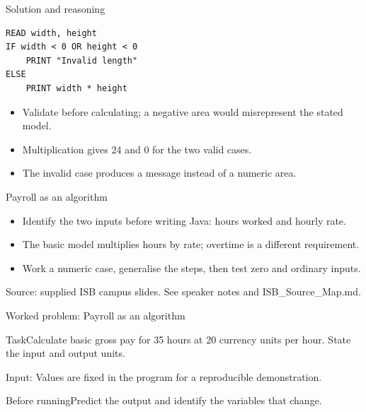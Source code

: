 \documentclass[10pt,aspectratio=169]{beamer}
\begin{document}
\begin{frame}[fragile,t]{Solution and reasoning}
\begin{lstlisting}
READ width, height
IF width < 0 OR height < 0
    PRINT "Invalid length"
ELSE
    PRINT width * height
\end{lstlisting}\vspace{1mm}\small\begin{itemize}
\item Validate before calculating; a negative area would misrepresent the stated model.
\item Multiplication gives 24 and 0 for the two valid cases.
\item The invalid case produces a message instead of a numeric area.
\end{itemize}
\end{frame}

\begin{frame}[fragile,t]{Payroll as an algorithm}
\begin{itemize}
\item Identify the two inputs before writing Java: hours worked and hourly rate.
\item The basic model multiplies hours by rate; overtime is a different requirement.
\item Work a numeric case, generalise the steps, then test zero and ordinary inputs.
\end{itemize}
\vspace{3mm}\footnotesize\textcolor{accent}{Source: supplied ISB campus slides. See speaker notes and ISB\_Source\_Map.md.}
\end{frame}

\begin{frame}[fragile,t]{Worked problem: Payroll as an algorithm}
\begin{block}{Task}Calculate basic gross pay for 35 hours at 20 currency units per hour. State the input and output units.\end{block}
\small Input: Values are fixed in the program for a reproducible demonstration.\par\vspace{3mm}\begin{exampleblock}{Before running}Predict the output and identify the variables that change.\end{exampleblock}
\end{frame}
\end{document}
